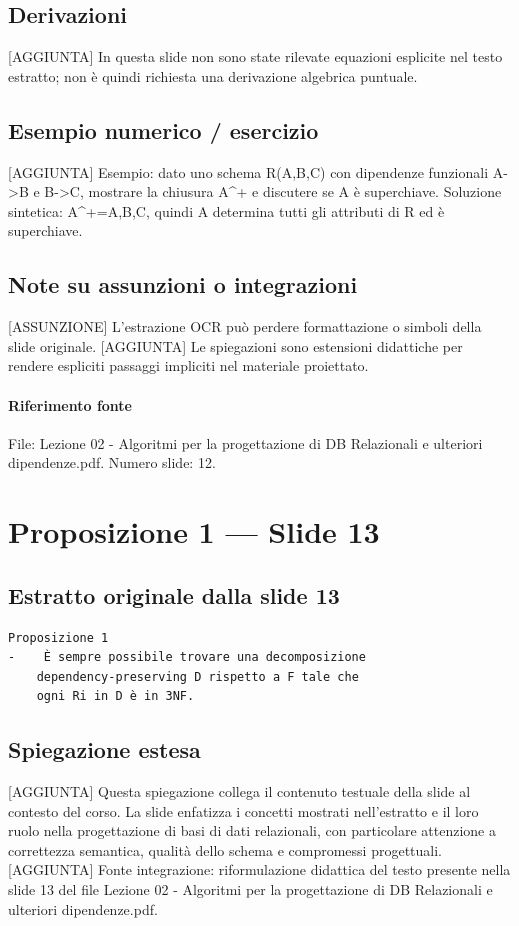 \documentclass[11pt]{article}
\begin{document}
\subsection*{Derivazioni}
[AGGIUNTA] In questa slide non sono state rilevate equazioni esplicite nel testo estratto; non è quindi richiesta una derivazione algebrica puntuale.
\subsection*{Esempio numerico / esercizio}
[AGGIUNTA] Esempio: dato uno schema R(A,B,C) con dipendenze funzionali A->B e B->C, mostrare la chiusura A^+ e discutere se A è superchiave. Soluzione sintetica: A^+={A,B,C}, quindi A determina tutti gli attributi di R ed è superchiave.
\subsection*{Note su assunzioni o integrazioni}
[ASSUNZIONE] L'estrazione OCR può perdere formattazione o simboli della slide originale.
[AGGIUNTA] Le spiegazioni sono estensioni didattiche per rendere espliciti passaggi impliciti nel materiale proiettato.
\paragraph{Riferimento fonte} File: Lezione 02 - Algoritmi per la progettazione di DB Relazionali e ulteriori dipendenze.pdf. Numero slide: 12.
\section{Proposizione 1 --- Slide 13}
\subsection*{Estratto originale dalla slide 13}
\begin{lstlisting}
Proposizione 1
-    È sempre possibile trovare una decomposizione
    dependency-preserving D rispetto a F tale che
    ogni Ri in D è in 3NF.
\end{lstlisting}
\subsection*{Spiegazione estesa}
[AGGIUNTA] Questa spiegazione collega il contenuto testuale della slide al contesto del corso. La slide enfatizza i concetti mostrati nell'estratto e il loro ruolo nella progettazione di basi di dati relazionali, con particolare attenzione a correttezza semantica, qualità dello schema e compromessi progettuali.
[AGGIUNTA] Fonte integrazione: riformulazione didattica del testo presente nella slide 13 del file Lezione 02 - Algoritmi per la progettazione di DB Relazionali e ulteriori dipendenze.pdf.
\end{document}
